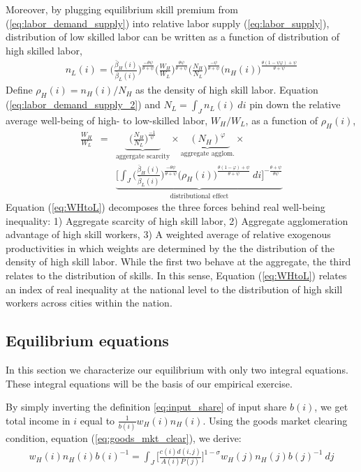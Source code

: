 \documentclass[12 pt]{article}
\begin{document}
Moreover, by plugging equilibrium skill premium from (\ref{eq:labor_demand_supply}) into relative labor supply (\ref{eq:labor_supply}), distribution of low skilled labor can be written as a function of distribution of high skilled labor,
\begin{eqnarray}\label{eq:labor_demand_supply_2}
n_L(i) = \Big( \frac{\bar{\beta}_H(i)}{\bar{\beta}_L(i)} \Big)^{\frac{-\theta\psi}{\theta+\psi}} 
\Big( \frac{W_H}{W_L} \Big)^{\frac{\theta\psi}{\theta+\psi}}
\Big( \frac{N_H}{N_L} \Big)^{\frac{-\psi}{\theta+\psi}}
\Big( n_H(i) \Big)^{\frac{\theta(1-\psi\varphi)+\psi}{\theta+\psi}}
\end{eqnarray}
Define $\rho_H(i) = n_H(i)/N_H$ as the density of high skill labor. Equation (\ref{eq:labor_demand_supply_2}) and $ N_L = \int_J n_L(i)~di $ pin down the relative average well-being of high- to low-skilled labor, $W_H/W_L$, as a function of $\rho_H(i)$,
\begin{eqnarray}\label{eq:WHtoL}
\frac{W_H}{W_L} & = &
\underbrace{~~\Big(\frac{N_H}{N_L}\Big)^{\frac{-1}{\psi}}~~}_{\mbox{aggergate scarcity}} \times \underbrace{~~(N_H)^{\varphi}~~}_{\mbox{aggregate agglom.}} \times \nonumber \\
&  &
\underbrace{\Bigg[ \int_J \Big( \frac{\bar{\beta}_H(i)}{\bar{\beta}_L(i)} \Big)^{\frac{-\theta\psi}{\theta+\psi}} \Big( \rho_H(i) \Big)^{\frac{\theta(1-\varphi)+\psi}{\theta+\psi}}~di \Bigg]^{-\frac{\theta+\psi}{\theta\psi}}}_{\mbox{distributional effect}} 
\end{eqnarray}
Equation (\ref{eq:WHtoL}) decomposes the three forces behind real well-being inequality: 1) Aggregate scarcity of high skill labor, 2) Aggregate agglomeration advantage of high skill workers, 3) A weighted average of relative exogenous productivities in which weights are determined by the the distribution of the density of high skill labor. While the  first two behave at the aggregate, the third relates to the distribution of skills. 
In this sense, Equation (\ref{eq:WHtoL}) relates an index of real inequality at the national level to the distribution of high skill workers across cities within the nation.
\subsection{Equilibrium equations}

In this section we characterize our equilibrium with only two integral equations.  These integral equations will be the basis of our empirical exercise.  

By simply inverting the definition \eqref{eq:input_share} of input share $b(i)$, we get total income in $i$ equal to $\frac{1}{b(i)} w_H(i)n_H(i)$. Using the goods market clearing condition, equation (\ref{eq:goods_mkt_clear}), we derive: 
\begin{eqnarray}
	w_H(i) n_H(i) b(i)^{-1} = 
	\int_J \Big[ \frac{c(i) d(i,j)}{A(i) P(j)} \Big]^{1-\sigma} w_H(j) n_H(j) b(j)^{-1} ~dj \nonumber
\end{eqnarray}
\end{document}

